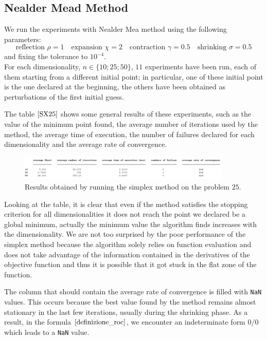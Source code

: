\subsection*{Nealder Mead Method}
We run the experiments with Nealder Mea method using the following parameters:
\begin{equation*}
    \text{reflection } \rho = 1 \quad
    \text{expansion } \chi = 2 \quad
    \text{contraction } \gamma = 0.5 \quad
    \text{shrinking } \sigma = 0.5
\end{equation*}
and fixing the tolerance to $10^{-4}$.
\\ For each dimensionality, $n \in \{10; 25; 50\}$, $11$ experiments have been run, each of them starting from a different initial point; in particular, one of these initial point is the one declared at the beginning, the others have been obtained as perturbations of the first initial guess.

The table $\eqref{SX25}$ shows some general results of these experiments, such as the value of the minimum point found, the average number of iterations used by the method, the average time of execution, the number of failures declared for each dimensionality and the average rate of convergence.
\begin{figure}[htbp]
    \centering
    \includegraphics[width = 0.9\textwidth]{img/pb25_SX_table.png}
    \caption{Results obtained by running the simplex method on the problem $25$.}
    \label{SX25}
\end{figure}

Looking at the table, it is clear that even if the method satisfies the stopping criterion for all dimensionalities it does not reach the point we declared be a global minimum, actually the minimum value the algorithm finds increases with the dimensionality.
We are not too surprised by the poor performance of the simplex method because the algorithm solely relies on function evaluation and does not take advantage of the information contained in the derivatives of the objective function and thus it is possible that it got stuck in the flat zone of the function.

The column that should contain the average rate of convergence is filled with \verb+NaN+ values. This occurs because the best value found by the method remains almost stationary in the last few iterations, usually during the shrinking phase. As a result, in the formula $\eqref{definizione_roc}$, we encounter an indeterminate form $0/0$ which leads to a \verb+NaN+ value.


